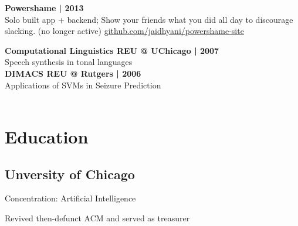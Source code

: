 \documentclass[]{resume}
\begin{document}
\begin{minipage}[t]{0.33\textwidth}
\textbf{Powershame | 2013} \\
Solo built app + backend; Show your friends what you did all day to discourage slacking. (no longer active)
\href{http://github.com/jaidhyani/powershame-site}{github.com/jaidhyani/powershame-site}
\sectionsep

\textbf{Computational Linguistics REU @ UChicago | 2007}\\
Speech synthesis in tonal languages\\

\textbf{DIMACS REU @ Rutgers | 2006}\\
Applications of SVMs in Seizure Prediction
\\
\\
\section{Education}
\subsection{Unversity of Chicago}
\sectionsep
\begin{tightemize}
\item Concentration: Artificial Intelligence
\item Revived then-defunct ACM and served as treasurer
\end{tightemize}
\sectionsep


%
%

\end{minipage}
\hfill
\end{document}
